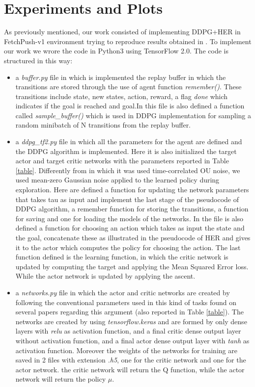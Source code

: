 \documentclass[a4paper]{report}
\begin{document}
\chapter{Experiments and Plots \label{exp}}

As previously  mentioned, our work consisted of implementing DDPG+HER in FetchPush-v1 environment trying to reproduce results obtained in \cite{her}. To implement our work we wrore the code in Python3 using TensorFlow 2.0. The code is structured in this way:

\begin{itemize}
\item a \textit{buffer.py} file in which is implemented the replay buffer in which the transitions are stored through the use of agent function \textit{remember()}. These transitions include state, new states, action, reward, a flag \textit{done} which indicates if the goal is reached and goal.In this file is also defined a function called \textit{sample\_buffer()} which is used in DDPG implementation for sampling a random minibatch of N transitions from the replay buffer.

\item a \textit{ddpg\_tf2.py} file in which all the parameters for the agent are defined and the DDPG algorithm is implemented. Here it is also initialized the target actor and target critic networks with the parameters reported in Table \ref{table}. Differently from \cite{her} in which it was used time-correlated OU noise, we used mean-zero Gaussian noise applied to the learned policy during exploration.
Here are defined a function for updating the network parameters that takes tau as input and implement the last stage of the pseudocode of DDPG algorithm, a remember function for storing the transitions, a function for saving and one for loading the models of the networks. In the file is also defined a function for choosing an action which takes as input the state and the goal, concatenate these as illustrated in the pseudocode of HER and gives it to the actor which computes the policy for choosing the action. The last function defined is the learning function, in which the critic network is updated by computing the target and applying the Mean Squared Error loss. While the actor network is updated by applying the ascent. 

\item a \textit{networks.py} file in which the actor and critic networks are created by following the conventional parameters used in this kind of tasks found on several papers regarding this argument (also reported in Table \ref{table}). The networks are created by using \textit{tensorflow.keras} and are formed by only dense layers with \textit{relu} as activation function, and a final critic dense output layer without activation function, and a final actor dense output layer with \textit{tanh} as activation function. Moreover the weights of the networks for training are saved in 2 files with extension \textit{.h5}, one for the critic network and one for the actor network. the critic network will return the Q function, while the actor network will return the policy $\mu$.




\end{itemize}
\end{document}
